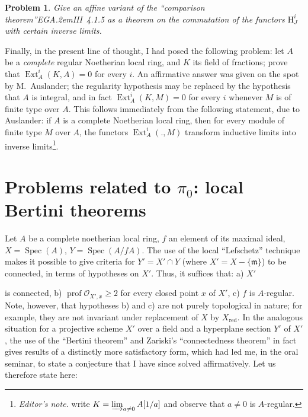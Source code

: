 \documentclass[11pt,a4paper,oneside]{book}
\providecommand{\sisi}[2]{#2}
\providecommand{\pageoriginale}{%
  \refstepcounter{pageoriginal}%
  \marginpar{\raggedright\footnotesize\bfseries\thepageoriginal}%
  \xspace}
\providecommand{\nde}[1]{\footnote{\textit{Editor's note.} #1}}
\providecommand{\og}{``}
\providecommand{\fg}{''\xspace}
\providecommand{\EGA}{\textup{EGA}\kern.2em}
\providecommand{\Oo}{\mathcal O}
\providecommand{\ideal}[1]{\mathfrak{#1}}
\providecommand{\mm}{\ideal m}
\providecommand{\Spec}{\operatorname{Spec}}
\providecommand{\Ext}{\operatorname{Ext}}
\providecommand{\prof}{\operatorname{prof}}
\renewcommand{\H}{\mathrm H}
\theoremstyle{plain}
\newtheorem{probleme}[subsection]{Problem}
\theoremstyle{definition}
\theoremstyle{remark}
\begin{document}
\begin{probleme} \label{XIII.1.4}
Give an affine variant of the \og comparison theorem\fg \textup{\EGA III~4.1.5} as a theorem on the commutation of the functors $\H^i_J$ with certain inverse limits.
\end{probleme}

Finally, in the present line of thought, I had posed the following problem: \sisi{L}{l}et $A$ be a \emph{complete} regular Noetherian local ring, and $K$ its field of fractions; prove that $\Ext^i_A(K, A)=0$ for every $i$. An affirmative answer was given on the spot by \sisi{Mr AUSLANDER}{M.~Auslander}; the regularity hypothesis may be replaced by the hypothesis that $A$ is integral, and in fact $\Ext^i_A(K, M)=0$ for every $i$ whenever $M$ is of finite type over $A$. This follows immediately from the following statement, due to \sisi{AUSLANDER}{Auslander}: if $A$ is a complete Noetherian local ring, then for every module of finite type $M$ over $A$, the functors $\Ext_A^i(., M)$ transform inductive limits into inverse limits\nde{write $K=\varinjlim_{a\neq 0}A[1/a]$ and observe that $a\neq 0$ is $A$-regular.}.

\section{\texorpdfstring{Problems related to $\pi_0$: local Bertini theorems}{Problems related to pi: local Bertini theorems}} \label{XIII.2}

Let $A$ be a complete noetherian local ring, $f$ an element of its
maximal ideal, $X=\Spec (A)$, $Y=\Spec(A/fA)$. The use of the local
\og Lefschetz\fg technique makes it possible to give criteria
for $Y'=X'\cap Y$ (where $X'=X-\{\mm\}$) to be connected, in terms
of hypotheses on $X'$. Thus, it suffices that: a) $X'$\pageoriginale
is connected\sisi{}{,} b) $\prof \Oo_{X', x} \ge 2$ for every closed point $x$
of $X'$\sisi{}{,} c) $f$ is $A$-regular. Note, however, that
hypotheses b) and c) are not purely
topological in nature; for example, they are not invariant\sisi{}{}
under replacement of $X$ by $X_{\text{red}}$. In the analogous situation
for a projective scheme $X'$ over a field and a hyperplane
section $Y'$ of $X'$, the use of the \og Bertini theorem\fg
and Zariski's \og connectedness theorem\fg in fact gives
results of a distinctly more satisfactory form,
which had led me, in the oral seminar, to state
a conjecture that I have since solved affirmatively.
Let us therefore state here:
\end{document}
